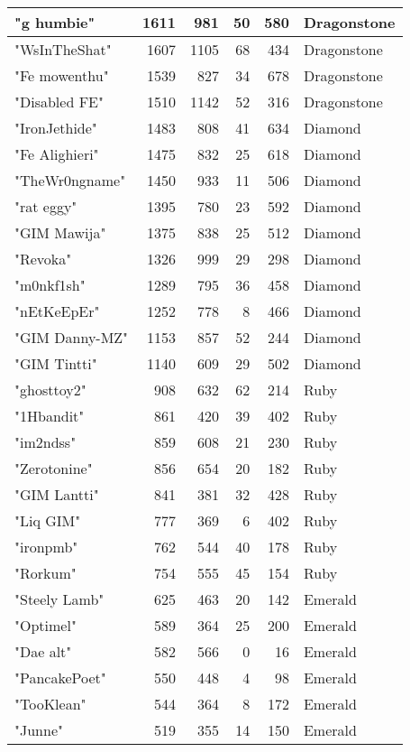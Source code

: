 \documentclass{article}
\begin{document}
\begin{table}[htbp]
\begin{tabular}{|l|r|r|r|r|l|}
"g humbie" & 1611 & 981 & 50 & 580 & Dragonstone \\ \hline
"WsInTheShat" & 1607 & 1105 & 68 & 434 & Dragonstone \\ \hline
"Fe mowenthu" & 1539 & 827 & 34 & 678 & Dragonstone \\ \hline
"Disabled FE" & 1510 & 1142 & 52 & 316 & Dragonstone \\ \hline
"IronJethide" & 1483 & 808 & 41 & 634 & Diamond \\ \hline
"Fe Alighieri" & 1475 & 832 & 25 & 618 & Diamond \\ \hline
"TheWr0ngname" & 1450 & 933 & 11 & 506 & Diamond \\ \hline
"rat eggy" & 1395 & 780 & 23 & 592 & Diamond \\ \hline
"GIM Mawija" & 1375 & 838 & 25 & 512 & Diamond \\ \hline
"Revoka" & 1326 & 999 & 29 & 298 & Diamond \\ \hline
"m0nkf1sh" & 1289 & 795 & 36 & 458 & Diamond \\ \hline
"nEtKeEpEr" & 1252 & 778 & 8 & 466 & Diamond \\ \hline
"GIM Danny-MZ" & 1153 & 857 & 52 & 244 & Diamond \\ \hline
"GIM Tintti" & 1140 & 609 & 29 & 502 & Diamond \\ \hline
"ghosttoy2" & 908 & 632 & 62 & 214 & Ruby \\ \hline
"1Hbandit" & 861 & 420 & 39 & 402 & Ruby \\ \hline
"im2ndss" & 859 & 608 & 21 & 230 & Ruby \\ \hline
"Zerotonine" & 856 & 654 & 20 & 182 & Ruby \\ \hline
"GIM Lantti" & 841 & 381 & 32 & 428 & Ruby \\ \hline
"Liq GIM" & 777 & 369 & 6 & 402 & Ruby \\ \hline
"ironpmb" & 762 & 544 & 40 & 178 & Ruby \\ \hline
"Rorkum" & 754 & 555 & 45 & 154 & Ruby \\ \hline
"Steely Lamb" & 625 & 463 & 20 & 142 & Emerald \\ \hline
"Optimel" & 589 & 364 & 25 & 200 & Emerald \\ \hline
"Dae alt" & 582 & 566 & 0 & 16 & Emerald \\ \hline
"PancakePoet" & 550 & 448 & 4 & 98 & Emerald \\ \hline
"TooKlean" & 544 & 364 & 8 & 172 & Emerald \\ \hline
"Junne" & 519 & 355 & 14 & 150 & Emerald \\ \hline

\end{tabular}
\end{table}
\end{document}
